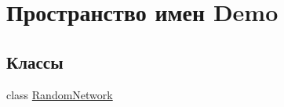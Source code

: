 \hypertarget{namespace_demo}{}\section{Пространство имен Demo}
\label{namespace_demo}
\subsection*{Классы}
\begin{DoxyCompactItemize}
\item 
class \hyperlink{class_demo_1_1_random_network}{Random\+Network}
\end{DoxyCompactItemize}
